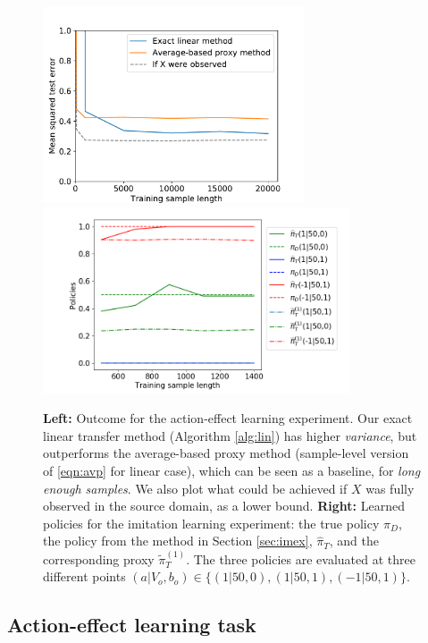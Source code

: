 \documentclass[letterpaper]{article} %
\theoremstyle{definition}%
\theoremstyle{definition}
\begin{document}
\begin{figure}
	\centering
	\includegraphics[height=5.8cm]{plotlin} %
	\hspace{-.4cm}
	\includegraphics[height=5.5cm]{figure_n.png}
	\caption{\textbf{Left:} Outcome for the action-effect learning experiment. Our exact linear transfer method (Algorithm \ref{alg:lin}) has higher \emph{variance}, but outperforms the average-based proxy method (sample-level version of \eqref{eqn:avp} for linear case), which can be seen as a baseline, for \emph{long enough samples}. We also plot what could be achieved if $X$ was fully observed in the source domain, as a lower bound. \textbf{Right:} Learned policies for the imitation learning experiment: the true policy $\pi_D$, the policy from the method in Section \ref{sec:imex}, $\hat{\pi}_T$, and the corresponding proxy $\tilde{\pi}^{(1)}_T$.
		The three policies are evaluated at three different points $(a|V_o, b_o) \in \{(1|50,0), (1|50,1), (-1|50,1)\}$.}
	\label{fig:explin}
\end{figure}

\subsection{{Action-effect learning task}}
\end{document}
